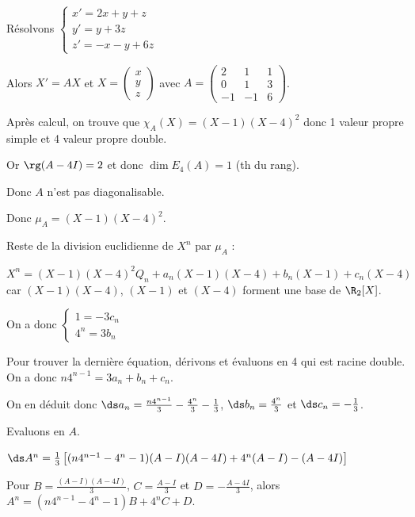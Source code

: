 \begin{exemple}
    Résolvons $\begin{cases}
        x' = 2x +y + z \\
        y' = y + 3z \\
        z' = -x - y + 6z
    \end{cases}$

    Alors $X' = AX$ et $X = \begin{pmatrix}
    x \\ y \\ z
    \end{pmatrix}$ avec $A = \begin{pmatrix}
    2 & 1 & 1 \\
    0 & 1 & 3 \\
    -1 & -1 & 6
    \end{pmatrix}$.

    Après calcul, on trouve que $\chi_A(X) = (X - 1)(X - 4)^2$ donc 1 valeur propre 
    simple et 4 valeur propre double. 

    Or $\rg (A - 4I) = 2$ et donc $\dim E_4(A) = 1$ (th du rang). 

    Donc $A$ n'est pas diagonalisable. 

    Donc $\mu_A = (X - 1)(X - 4)^2$.

    Reste de la division euclidienne de $X^n$ par $\mu_A$ : 

    $X^n = (X - 1)(X - 4)^2 Q_n + a_n(X - 1)(X - 4) + b_n(X - 1) + c_n(X - 4)$
    car $(X - 1)(X - 4)$, $(X - 1)$ et $(X - 4)$ forment une base de $\R_{2}[X]$.

    On a donc  $\begin{cases}
        1 = -3c_n \\
        4^n = 3 b_n
    \end{cases}$

    Pour trouver la dernière équation, dérivons et évaluons en 4 qui est racine double.
    On a donc $n 4^{n - 1} = 3 a_n + b_n + c_n$.

    On en déduit donc $\ds a_n = \frac{n 4^{n - 1}}{3} - \frac{4^n}{3} - \frac 1 3$, 
    $\ds b_n = \frac{4^n}{3}$ et $\ds c_n = -\frac 1 3$.

    Evaluons en $A$. 

    $\ds A^n = \frac 1 3 \left[ (n 4^{n - 1} - 4^n - 1)(A - I)(A - 4I) + 4^n (A - I) - (A - 4I) \right]$

    Pour $B = \frac{(A - I)(A - 4I)}{3}$, $C = \frac{A - I} 3$ et $D = -\frac{A - 4I}{3}$, alors
    $A^n = (n 4^{n - 1} - 4^n - 1) B + 4^n C + D$.


\end{exemple}
